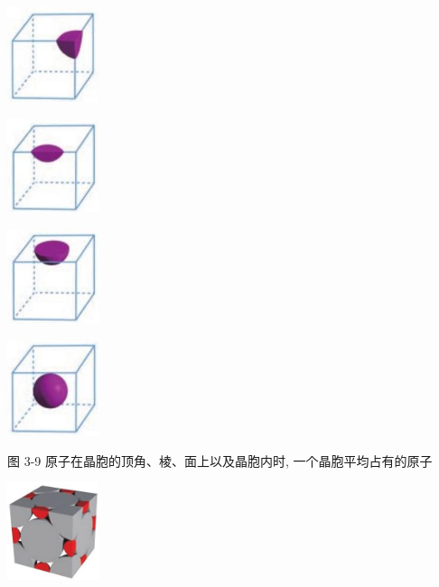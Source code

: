 \documentclass[10pt]{article}
\begin{document}
\begin{center}
\includegraphics[max width=0.2\textwidth]{images/0190e026-5a11-7df7-bd27-54d09026ba7a_77_683697.jpg}
\end{center}

\begin{center}
\includegraphics[max width=0.2\textwidth]{images/0190e026-5a11-7df7-bd27-54d09026ba7a_77_105282.jpg}
\end{center}

\begin{center}
\includegraphics[max width=0.2\textwidth]{images/0190e026-5a11-7df7-bd27-54d09026ba7a_77_998135.jpg}
\end{center}

\begin{center}
\includegraphics[max width=0.2\textwidth]{images/0190e026-5a11-7df7-bd27-54d09026ba7a_77_305403.jpg}
\end{center}

图 3-9 原子在晶胞的顶角、棱、面上以及晶胞内时, 一个晶胞平均占有的原子

\begin{center}
\includegraphics[max width=0.2\textwidth]{images/0190e026-5a11-7df7-bd27-54d09026ba7a_77_504949.jpg}
\end{center}
\end{document}
